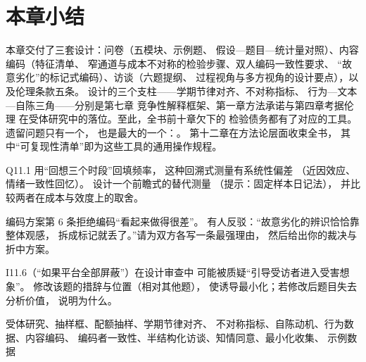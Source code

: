 \section{本章小结}\label{sec:11:summary}

本章交付了三套设计：问卷（五模块、示例题、
假设—题目—统计量对照）、内容编码（特征清单、
窄通道与成本不对称的检验步骤、双人编码一致性要求、
“故意劣化”的标记式编码）、访谈（六题提纲、
过程视角与多方视角的设计要点），以及伦理条款五条。
设计的三个支柱——学期节律对齐、不对称指标、
行为—文本—自陈三角——分别是第七章
竞争性解释框架、第一章方法承诺与第四章考据伦理
在受体研究中的落位。至此，全书前十章欠下的
检验债务都有了对应的工具。遗留问题只有一个，
也是最大的一个：。
第十二章在方法论层面收束全书，
其中“可复现性清单”即为这些工具的通用操作规程。

\begin{nlexercises}
  \item Q11.1 用“回想三个时段”回填频率，
        这种回溯式测量有系统性偏差
        （近因效应、情绪一致性回忆）。
        设计一个前瞻式的替代测量
        （提示：固定样本日记法），
        并比较两者在成本与效度上的取舍。
  \item 编码方案第 6 条拒绝编码“看起来做得很差”。
        有人反驳：“故意劣化的辨识恰恰靠整体观感，
        拆成标记就丢了。”请为双方各写一条最强理由，
        然后给出你的裁决与折中方案。
  \item I11.6（“如果平台全部屏蔽”）在设计审查中
        可能被质疑“引导受访者进入受害想象”。
        修改该题的措辞与位置（相对其他题），
        使诱导最小化；若修改后题目失去分析价值，
        说明为什么。
\end{nlexercises}

\nlkeywords 受体研究、抽样框、配额抽样、学期节律对齐、
不对称指标、自陈动机、行为数据、内容编码、
编码者一致性、半结构化访谈、知情同意、最小化收集、
示例数据
